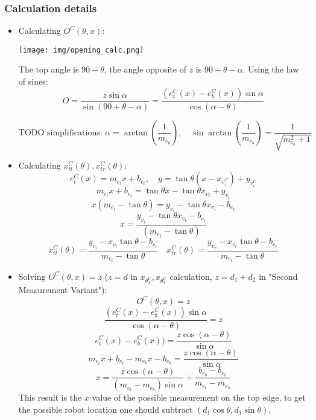 \documentclass[a4paper,12pt]{extarticle}
\begin{document}
\newpage{}
\subsubsection*{Calculation details}

\begin{itemize}
  \item Calculating $O^{C}(\theta, x)$:
        \begin{center} \texttt{[image: img/opening\_calc.png]} \end{center}
        The top angle is $90-\theta$, the angle opposite of $z$ is $90 + \theta -\alpha$. Using the law of sines:
        \[ O=\frac{z\sin \alpha}{\sin (90 + \theta -\alpha)}=\frac{(e^{C}_{t}(x)-e^{C}_{b}(x))\sin \alpha}{\cos (\alpha - \theta)} \]

    \[ \text{TODO simplifications: } \alpha = \arctan (\frac{1}{m_{e_{b}}}) ,\quad \sin \arctan (\frac{1}{m_{e_{b}}}) = \frac{1}{\sqrt{m_{e_{b}}^2 + 1}} \]

  \item Calculating $x^{C}_{tl}(\theta),x^{C}_{tr}(\theta)$:
        \[ e^{C}_{t}(x)=m_{e_{t}}x+b_{e_{t}} ,\quad y=\tan \theta (x - x_{v^{C}_{i}}) + y_{v^{C}_{i}} \]
        \[ m_{e_{t}}x+b_{e_{t}}=\tan \theta x - \tan \theta x_{v_{i}} + y_{v_{i}} \]
        \[ x(m_{e_{t}} - \tan \theta)= y_{v_{i}} - \tan \theta x_{v_{i}} -b_{e_{t}} \]
        \[ x= \frac{y_{v_{i}} - \tan \theta x_{v_{i}} -b_{e_{t}}}{(m_{e_{t}} - \tan \theta)}\]
        \[ x^{C}_{tl}(\theta)=\frac{y_{v_{l}} - x_{v_{l}} \tan \theta -b_{e_{t}}}{m_{e_{t}}- \tan \theta} \quad x^{C}_{tr}(\theta)=\frac{y_{v_{r}} - x_{v_{r}} \tan \theta -b_{e_{t}}}{m_{e_{t}}- \tan \theta} \]

    \item Solving $O^{C}(\theta,x)=z$ ($z=d$ in $x_{\theta^{C}_{2}},x_{\theta^{C}_{3}}$ calculation, $z=d_{1}+d_{2}$ in "Second Measurement Variant"):
    \[ O^{C}(\theta,x)=z \]
    \[ \frac{(e^{C}_{t}(x)-e^{C}_{b}(x))\sin \alpha}{\cos (\alpha - \theta)}=z \]
    \[ e^{C}_{t}(x)-e^{C}_{b}(x))=\frac{z \cos (\alpha - \theta)}{\sin \alpha} \]
    \[ m_{e_{t}}x +b_{e_{t}}-m_{e_{b}}x -b_{e_{b}}=\frac{z \cos (\alpha - \theta)}{\sin \alpha} \]
    \[ x=\frac{z \cos (\alpha - \theta)}{(m_{e_{t}} -m_{e_{b}})\sin \alpha} + \frac{b_{e_{b}} - b_{e_{t}}}{m_{e_{t}} -m_{e_{b}}}\]
    This result is the $x$ value of the possible measurement on the top edge, to get the possible robot location one should subtract $(d_{1}\cos \theta,d_{1}\sin \theta)$.

\end{itemize}
\end{document}
